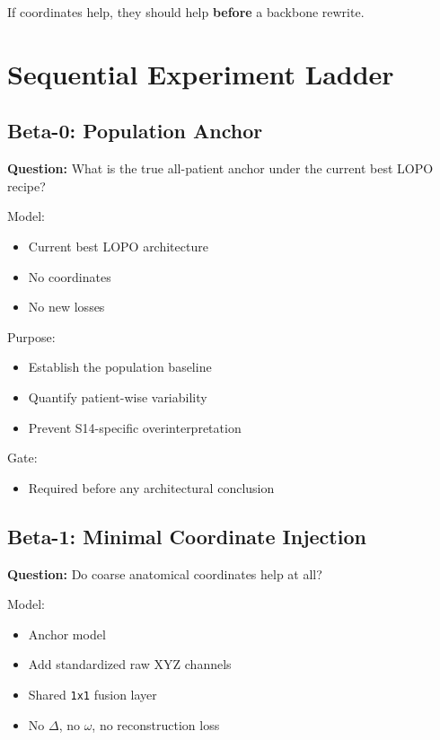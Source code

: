 \documentclass[
]{article}
\providecommand{\tightlist}{%
  \setlength{\itemsep}{0pt}\setlength{\parskip}{0pt}}
\begin{document}
If coordinates help, they should help \textbf{before} a backbone
rewrite.

\section{Sequential Experiment
Ladder}\label{sequential-experiment-ladder}

\subsection{Beta-0: Population Anchor}\label{beta-0-population-anchor}

\textbf{Question:} What is the true all-patient anchor under the current
best LOPO recipe?

Model:

\begin{itemize}
\tightlist
\item
  Current best LOPO architecture
\item
  No coordinates
\item
  No new losses
\end{itemize}

Purpose:

\begin{itemize}
\tightlist
\item
  Establish the population baseline
\item
  Quantify patient-wise variability
\item
  Prevent S14-specific overinterpretation
\end{itemize}

Gate:

\begin{itemize}
\tightlist
\item
  Required before any architectural conclusion
\end{itemize}

\subsection{Beta-1: Minimal Coordinate
Injection}\label{beta-1-minimal-coordinate-injection}

\textbf{Question:} Do coarse anatomical coordinates help at all?

Model:

\begin{itemize}
\tightlist
\item
  Anchor model
\item
  Add standardized raw XYZ channels
\item
  Shared \texttt{1x1} fusion layer
\item
  No \(\Delta\), no \(\omega\), no reconstruction loss
\end{itemize}
\end{document}
